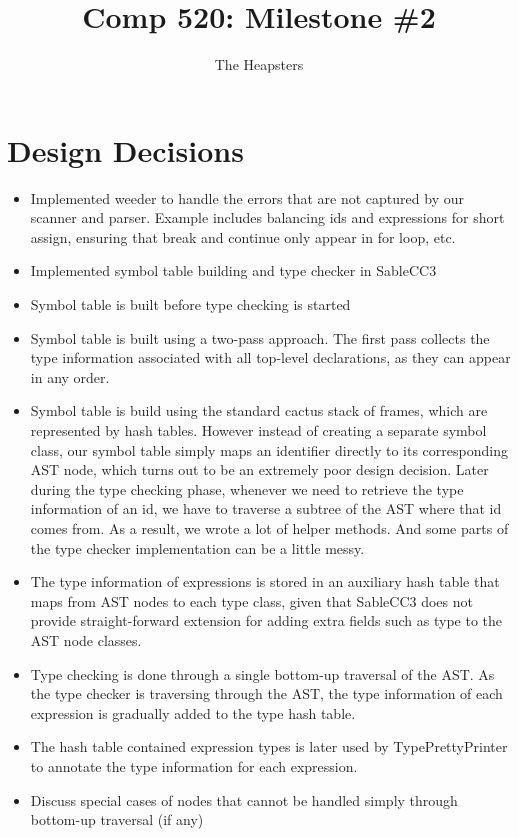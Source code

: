 \documentclass{article}
\title{Comp 520: Milestone \#2}
\author{The Heapsters}
\date{}
\begin{document}
\maketitle

\section{Design Decisions}

\begin{itemize}
\item Implemented weeder to handle the errors that are not captured by our scanner and parser. Example includes balancing ids and expressions for short assign, ensuring that break and continue only appear in for loop, etc.
\item Implemented symbol table building and type checker in SableCC3
\item Symbol table is built before type checking is started
\item Symbol table is built using a two-pass approach. The first pass collects the type information associated with all top-level declarations, as they can appear in any order.
\item Symbol table is build using the standard cactus stack of frames, which are represented by hash tables. However instead of creating a separate symbol class, our symbol table simply maps an identifier directly to its corresponding AST node, which turns out to be an extremely poor design decision. Later during the type checking phase, whenever we need to retrieve the type information of an id, we have to traverse a subtree of the AST where that id comes from. As a result, we wrote a lot of helper methods. And some parts of the type checker implementation can be a little messy.
\item The type information of expressions is stored in an auxiliary hash table that maps from AST nodes to each type class, given that SableCC3 does not provide straight-forward extension for adding extra fields such as type to the AST node classes.
\item Type checking is done through a single bottom-up traversal of the AST. As the type checker is traversing through the AST, the type information of each expression is gradually added to the type hash table.
\item The hash table contained expression types is later used by TypePrettyPrinter to annotate the type information for each expression.
\item Discuss special cases of nodes that cannot be handled simply through bottom-up traversal (if any)
\end{itemize}
\end{document}
